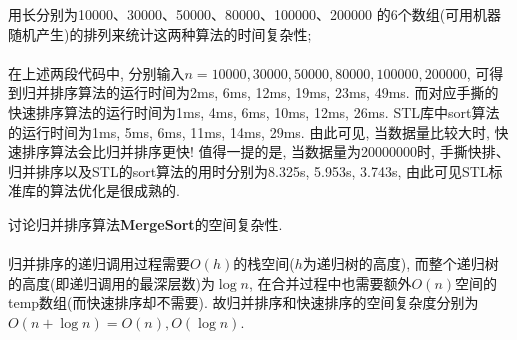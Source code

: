 \documentclass{article}
\begin{document}
\begin{homeworkProblem}
	用长分别为10000、30000、50000、80000、100000、200000 的6个数组(可用机器随机产生)的排列来统计这两种算法的时间复杂性;
	\\

	\solution
	\\

	在上述两段代码中, 分别输入$n=10000, 30000, 50000, 80000, 100000, 200000$, 可得到归并排序算法的运行时间为2ms, 6ms, 12ms, 19ms, 23ms, 49ms. 而对应手撕的快速排序算法的运行时间为1ms, 4ms, 6ms, 10ms, 12ms, 26ms. STL库中sort算法的运行时间为1ms, 5ms, 6ms, 11ms, 14ms, 29ms. 由此可见, 当数据量比较大时, 快速排序算法会比归并排序更快! 值得一提的是, 当数据量为20000000时, 手撕快排、归并排序以及STL的sort算法的用时分别为8.325s, 5.953s, 3.743s, 由此可见STL标准库的算法优化是很成熟的.
\end{homeworkProblem}



\begin{homeworkProblem}
	讨论归并排序算法\textbf{MergeSort}的空间复杂性.
	\\

	\solution
	\\

	归并排序的递归调用过程需要$O(h)$的栈空间($h$为递归树的高度), 而整个递归树的高度(即递归调用的最深层数)为$\log n$, 在合并过程中也需要额外$O(n)$空间的temp数组(而快速排序却不需要). 故归并排序和快速排序的空间复杂度分别为$O(n + \log n)=O(n), O(\log n)$.
\end{homeworkProblem}
\end{document}
